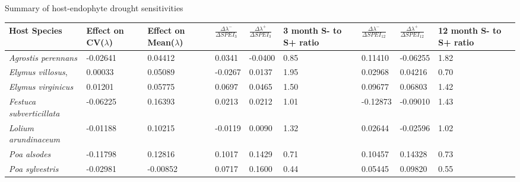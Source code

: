 \documentclass[12pt]{article}
\begin{document}
 Summary of host-endophyte drought sensitivities\\
\begin{table}[ht]
	\begin{adjustbox}{width=1\textwidth}{
			\begin{tabular}{|p{4cm}| p{2cm} |p{2cm}|p{2cm}|p{2cm}| p{2cm}|p{2cm}|p{2cm}|p{2cm}|}
				\hline
				\bf{Host Species} & \bf{Effect on CV($\lambda$)}& \bf{Effect on Mean($\lambda$)}&$\frac{\Delta\lambda^{-}}{\Delta SPEI_{3}}$ & $\frac{\Delta\lambda^{+}}{\Delta SPEI_{3}}$ &\bf{3 month S- to S+ ratio}&$\frac{\Delta\lambda^{-}}{\Delta SPEI_{12}}$ &$\frac{\Delta\lambda^{+}}{\Delta SPEI_{12}}$ &\bf{12 month S- to S+ ratio}\\
				\hline
				\emph{Agrostis perennans} &-0.02641&0.04412&0.0341&-0.0400&0.85&0.11410&-0.06255&1.82\\
				\emph{Elymus villosus}, &0.00033&0.05089&-0.0267&0.0137&1.95&0.02968&0.04216&0.70\\
				\emph{Elymus virginicus} &0.01201&0.05775&0.0697&0.0465&1.50&0.09677&0.06803&1.42\\
				\emph{Festuca subverticillata} &-0.06225&0.16393&0.0213&0.0212&1.01&-0.12873&-0.09010&1.43\\
				\emph{Lolium arundinaceum} &-0.01188&0.10215&-0.0119&0.0090&1.32&0.02644&-0.02596&1.02\\
				\emph{Poa alsodes} &-0.11798&0.12816&0.1017&0.1429&0.71&0.10457&0.14328&0.73\\
				\emph{Poa sylvestris}&-0.02981&-0.00852&0.0717&0.1600&0.44&0.05445&0.09820&0.55\\
				\hline
		\end{tabular}}
	\end{adjustbox}
\end{table}
\end{document}
